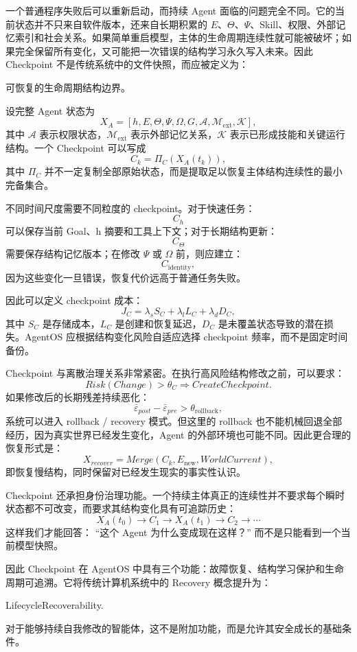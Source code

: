 一个普通程序失败后可以重新启动，而持续 Agent 面临的问题完全不同。它的当前状态并不只来自软件版本，还来自长期积累的 $E$、$\Theta$、$\Psi$、Skill、权限、外部记忆索引和社会关系。如果简单重启模型，主体的生命周期连续性就可能被破坏；如果完全保留所有变化，又可能把一次错误的结构学习永久写入未来。因此 Checkpoint 不是传统系统中的文件快照，而应被定义为：
\begin{definition*}
可恢复的生命周期结构边界。
\end{definition*}

设完整 Agent 状态为
\[
X_A
=
[
h,E,\Theta,\Psi,\Omega,
G,
\mathcal A,
\mathcal M_{\mathrm{ext}},
\mathcal K
],
\]
其中 $\mathcal A$ 表示权限状态，$\mathcal M_{\mathrm{ext}}$ 表示外部记忆关系，$\mathcal K$ 表示已形成技能和关键运行结构。一个 Checkpoint 可以写成
\[
C_k
=
\Pi_C(X_A(t_k)),
\]
其中 $\Pi_C$ 并不一定复制全部原始状态，而是提取足以恢复主体结构连续性的最小完备集合。

不同时间尺度需要不同粒度的 checkpoint。对于快速任务：
\[
C_h
\]
可以保存当前 Goal、h 摘要和工具上下文；对于长期结构更新：
\[
C_\Theta
\]
需要保存结构记忆版本；在修改 $\Psi$ 或 $\Omega$ 前，则应建立：
\[
C_{\mathrm{identity}},
\]
因为这些变化一旦错误，恢复代价远高于普通任务失败。

因此可以定义 checkpoint 成本：
\[
J_C
=
\lambda_s S_C
+
\lambda_l L_C
+
\lambda_d D_C,
\]
其中 $S_C$ 是存储成本，$L_C$ 是创建和恢复延迟，$D_C$ 是未覆盖状态导致的潜在损失。AgentOS 应根据结构变化风险自适应选择 checkpoint 频率，而不是固定时间备份。

Checkpoint 与离散治理关系非常紧密。在执行高风险结构修改之前，可以要求：
\[
Risk(Change)>\theta_C
\Rightarrow
CreateCheckpoint.
\]
如果修改后的长期残差持续恶化：
\[
\bar{\varepsilon}_{post}
-
\bar{\varepsilon}_{pre}
>
\theta_{\mathrm{rollback}},
\]
系统可以进入 rollback / recovery 模式。但这里的 rollback 也不能机械回退全部经历，因为真实世界已经发生变化，Agent 的外部环境也可能不同。因此更合理的恢复形式是：
\[
X_{recover}
=
Merge
\left(
C_k,
E_{\mathrm{new}},
WorldCurrent
\right),
\]
即恢复慢结构，同时保留对已经发生现实的事实性认识。

Checkpoint 还承担身份治理功能。一个持续主体真正的连续性并不要求每个瞬时状态都不可改变，而要求其结构变化具有可追踪历史：
\[
X_A(t_0)
\rightarrow
C_1
\rightarrow
X_A(t_1)
\rightarrow
C_2
\rightarrow\cdots
\]
这样我们才能回答：
``这个 Agent 为什么变成现在这样？''
而不是只能看到一个当前模型快照。

因此 Checkpoint 在 AgentOS 中具有三个功能：故障恢复、结构学习保护和生命周期可追溯。它将传统计算机系统中的 Recovery 概念提升为：
\begin{statementbox}
LifecycleRecoverability.
\end{statementbox}
对于能够持续自我修改的智能体，这不是附加功能，而是允许其安全成长的基础条件。

